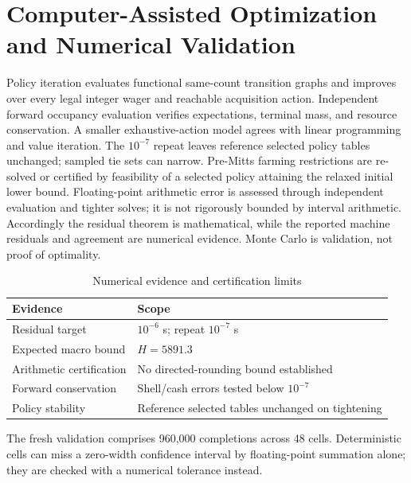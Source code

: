\documentclass[11pt]{article}
\theoremstyle{definition}\newtheorem{definition}[theorem]{Definition}
\begin{document}
\section{Computer-Assisted Optimization and Numerical Validation}
Policy iteration evaluates functional same-count transition graphs and improves over every legal integer wager and reachable acquisition action. Independent forward occupancy evaluation verifies expectations, terminal mass, and resource conservation. A smaller exhaustive-action model agrees with linear programming and value iteration. The $10^{-7}$ repeat leaves reference selected policy tables unchanged; sampled tie sets can narrow. Pre-Mitts farming restrictions are re-solved or certified by feasibility of a selected policy attaining the relaxed initial lower bound.
Floating-point arithmetic error is assessed through independent evaluation and tighter solves; it is not rigorously bounded by interval arithmetic. Accordingly the residual theorem is mathematical, while the reported machine residuals and agreement are numerical evidence. Monte Carlo is validation, not proof of optimality.
\begin{table}[H]\centering\small
\begin{tabular}{ll}\toprule
Evidence & Scope\\\midrule
Residual target & $10^{-6}$ s; repeat $10^{-7}$ s\\
Expected macro bound & $H=5891.3$\\
Arithmetic certification & No directed-rounding bound established\\
Forward conservation & Shell/cash errors tested below $10^{-7}$\\
Policy stability & Reference selected tables unchanged on tightening\\
\bottomrule\end{tabular}
\caption{Numerical evidence and certification limits}\label{tab:result-1}\end{table}
The fresh validation comprises 960,000 completions across 48 cells. Deterministic cells can miss a zero-width confidence interval by floating-point summation alone; they are checked with a numerical tolerance instead. 
\end{document}

